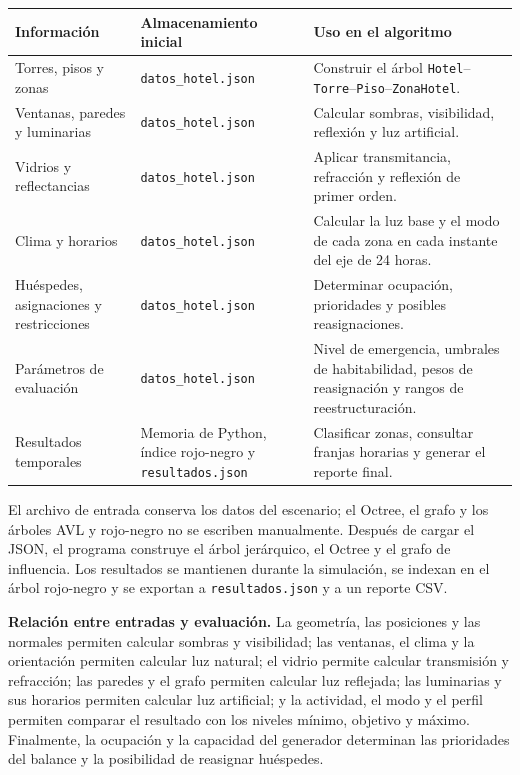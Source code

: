 \documentclass[12pt,a4paper]{article}
\newcommand{\clase}[1]{\texttt{#1}}
\newcommand{\codigo}[1]{\texttt{#1}}
\begin{document}
\begin{center}\small
\begin{tabular}{p{}p{}p{}}
\toprule
\textbf{Información} & \textbf{Almacenamiento inicial} & \textbf{Uso en el algoritmo}\\
\midrule
Torres, pisos y zonas & \codigo{datos\_hotel.json} & Construir el árbol \clase{Hotel}--\clase{Torre}--\clase{Piso}--\clase{ZonaHotel}.\\
Ventanas, paredes y luminarias & \codigo{datos\_hotel.json} & Calcular sombras, visibilidad, reflexión y luz artificial.\\
Vidrios y reflectancias & \codigo{datos\_hotel.json} & Aplicar transmitancia, refracción y reflexión de primer orden.\\
Clima y horarios & \codigo{datos\_hotel.json} & Calcular la luz base y el modo de cada zona en cada instante del eje de 24 horas.\\
Huéspedes, asignaciones y restricciones & \codigo{datos\_hotel.json} & Determinar ocupación, prioridades y posibles reasignaciones.\\
Parámetros de evaluación & \codigo{datos\_hotel.json} & Nivel de emergencia, umbrales de habitabilidad, pesos de reasignación y rangos de reestructuración.\\
Resultados temporales & Memoria de Python, índice rojo-negro y \codigo{resultados.json} & Clasificar zonas, consultar franjas horarias y generar el reporte final.\\
\bottomrule
\end{tabular}
\end{center}

El archivo de entrada conserva los datos del escenario; el Octree, el grafo y los árboles AVL y rojo-negro no se escriben manualmente. Después de cargar el JSON, el programa construye el árbol jerárquico, el Octree y el grafo de influencia. Los resultados se mantienen durante la simulación, se indexan en el árbol rojo-negro y se exportan a \codigo{resultados.json} y a un reporte CSV.

\textbf{Relación entre entradas y evaluación.} La geometría, las posiciones y las normales permiten calcular sombras y visibilidad; las ventanas, el clima y la orientación permiten calcular luz natural; el vidrio permite calcular transmisión y refracción; las paredes y el grafo permiten calcular luz reflejada; las luminarias y sus horarios permiten calcular luz artificial; y la actividad, el modo y el perfil permiten comparar el resultado con los niveles mínimo, objetivo y máximo. Finalmente, la ocupación y la capacidad del generador determinan las prioridades del balance y la posibilidad de reasignar huéspedes.
\end{document}
